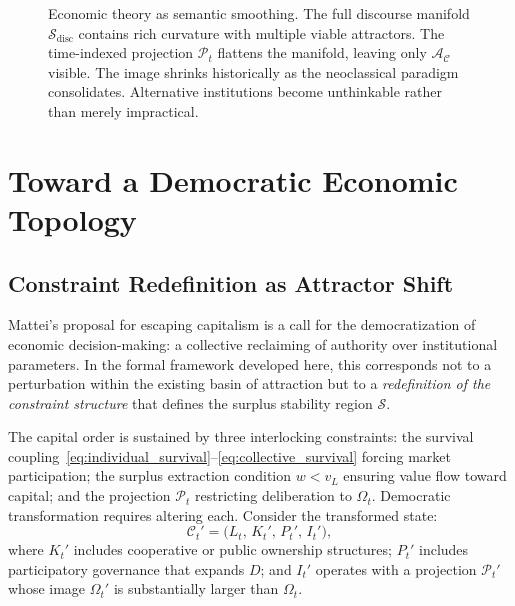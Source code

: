 \documentclass[12pt,a4paper]{article}
\theoremstyle{definition}
\theoremstyle{remark}
\begin{document}
\begin{figure}[ht]
\caption{Economic theory as semantic smoothing. The full discourse manifold $\mathcal{S}_{\mathrm{disc}}$ contains rich curvature with multiple viable attractors. The time-indexed projection $\mathcal{P}_t$ flattens the manifold, leaving only $\mathcal{A}_\mathcal{C}$ visible. The image shrinks historically as the neoclassical paradigm consolidates. Alternative institutions become unthinkable rather than merely impractical.}
\label{fig:semantic}
\end{figure}

\section{Toward a Democratic Economic Topology}
\label{sec:democracy}

\subsection{Constraint Redefinition as Attractor Shift}

Mattei's proposal for escaping capitalism is a call for the democratization of economic decision-making: a collective reclaiming of authority over institutional parameters. In the formal framework developed here, this corresponds not to a perturbation within the existing basin of attraction but to a \emph{redefinition of the constraint structure} that defines the surplus stability region $\mathcal{S}$.

The capital order is sustained by three interlocking constraints: the survival coupling~\eqref{eq:individual_survival}--\eqref{eq:collective_survival} forcing market participation; the surplus extraction condition $w < v_L$ ensuring value flow toward capital; and the projection $\mathcal{P}_t$ restricting deliberation to $\Omega_t$. Democratic transformation requires altering each. Consider the transformed state:
\begin{equation}
  \mathcal{C}_t' = \bigl(L_t,\, K_t',\, P_t',\, I_t'\bigr),
\end{equation}
where $K_t'$ includes cooperative or public ownership structures; $P_t'$ includes participatory governance that expands $D$; and $I_t'$ operates with a projection $\mathcal{P}_t'$ whose image $\Omega_t'$ is substantially larger than $\Omega_t$.
\end{document}
